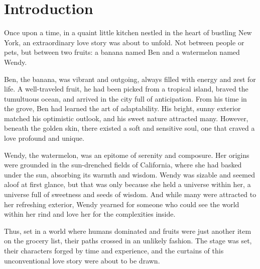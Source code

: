 \section{Introduction}
Once upon a time, in a quaint little kitchen nestled in the heart of bustling New York, an extraordinary love story was about to unfold. Not between people or pets, but between two fruits: a banana named Ben and a watermelon named Wendy.

Ben, the banana, was vibrant and outgoing, always filled with energy and zest for life. A well-traveled fruit, he had been picked from a tropical island, braved the tumultuous ocean, and arrived in the city full of anticipation. From his time in the grove, Ben had learned the art of adaptability. His bright, sunny exterior matched his optimistic outlook, and his sweet nature attracted many. However, beneath the golden skin, there existed a soft and sensitive soul, one that craved a love profound and unique.

Wendy, the watermelon, was an epitome of serenity and composure. Her origins were grounded in the sun-drenched fields of California, where she had basked under the sun, absorbing its warmth and wisdom. Wendy was sizable and seemed aloof at first glance, but that was only because she held a universe within her, a universe full of sweetness and seeds of wisdom. And while many were attracted to her refreshing exterior, Wendy yearned for someone who could see the world within her rind and love her for the complexities inside.

Thus, set in a world where humans dominated and fruits were just another item on the grocery list, their paths crossed in an unlikely fashion. The stage was set, their characters forged by time and experience, and the curtains of this unconventional love story were about to be drawn.
